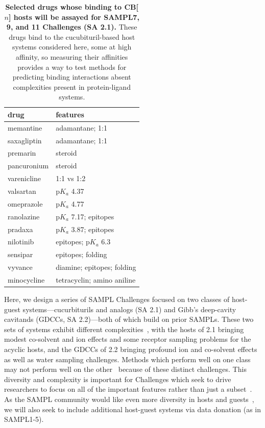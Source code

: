 \documentclass[11pt]{article}
\begin{document}
\begin{table}
\vspace{-0.2in}
\footnotesize
\begin{tabular}{l | l}
{\bf drug} & {\bf features} \\
\hline
memantine & adamantane; 1:1 \\
saxagliptin & adamantane; 1:1 \\
premarin & steroid \\
pancuronium & steroid\\
varenicline & 1:1 vs 1:2 \\
valsartan & p$K_a$ 4.37 \\ 
omeprazole & p$K_a$ 4.77 \\
ranolazine & p$K_a$ 7.17; epitopes \\
pradaxa & p$K_a$ 3.87; epitopes \\
nilotinib & epitopes; p$K_a$ 6.3 \\
sensipar & epitopes; folding \\
vyvance & diamine; epitopes; folding \\
minocycline & tetracyclin; amino aniline \\
\end{tabular}
\caption{\textbf{\label{table:CB} Selected drugs whose binding to CB[$n$] hosts will be assayed for SAMPL7, 9, and 11 Challenges (SA 2.1).}  
These drugs bind to the cucubituril-based host systems considered here, some at high affinity, so measuring their affinities provides a way to test methods for predicting binding interactions absent complexities present in protein-ligand systems.
}
\vspace{-0.1in}
\end{table}

Here, we design a series of SAMPL Challenges focused on two classes of host-guest systems---cucurbiturils and analogs (SA 2.1) and Gibb's deep-cavity cavitands (GDCCs, SA 2.2)---both of which build on prior SAMPLs.
These two sets of systems exhibit different complexities~\cite{Mobley:2017:AnnualReviewofBiophysics}, with the hosts of 2.1 bringing modest co-solvent and ion effects and some receptor sampling problems for the acyclic hosts, and the GDCCs of 2.2 bringing profound ion and co-solvent effects as well as water sampling challenges.
Methods which perform well on one class may not perform well on the other~\cite{Mobley:2017:AnnualReviewofBiophysics} because of these distinct challenges.
This diversity and complexity is important for Challenges which seek to drive researchers to focus on all of the important features rather than just a subset~\cite{Saez-Rodriguez:2016:NatRevGenet}.
As the SAMPL community would like even more diversity in hosts and guests~\cite{Mobley:2017:eScholarship}, we will also seek to include additional host-guest systems via data donation (as in SAMPL1-5).
\end{document}
